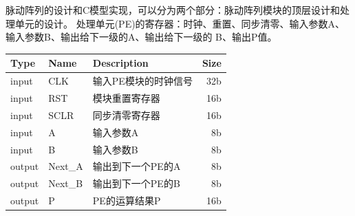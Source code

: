 
脉动阵列的设计和C模型实现，可以分为两个部分：脉动阵列模块的顶层设计和处理单元的设计。
处理单元(PE)的寄存器：时钟、重置、同步清零、输入参数A、输入参数B、输出给下一级的A、输出给下一级的
B、输出P值。

\begin{table}[!hpt]
    \label{tab:firstone}
    \centering
    \begin{tabular}{@{}lllr@{}} \toprule
        Type & Name & Description & Size \\ \midrule
        input  & CLK  & 输入PE模块的时钟信号 & 32b \\
        input  & RST  & 模块重置寄存器 & 16b \\
        input   & SCLR   & 同步清零寄存器 & 16b \\
        input   & A   & 输入参数A & 8b \\
        input   & B   & 输入参数B & 8b \\
        output   & Next\_A   & 输出到下一个PE的A & 8b \\
        output   & Next\_B   & 输出到下一个PE的B & 8b \\
        output & P & PE的运算结果P & 16b \\ \bottomrule
    \end{tabular}
  \end{table}

  





